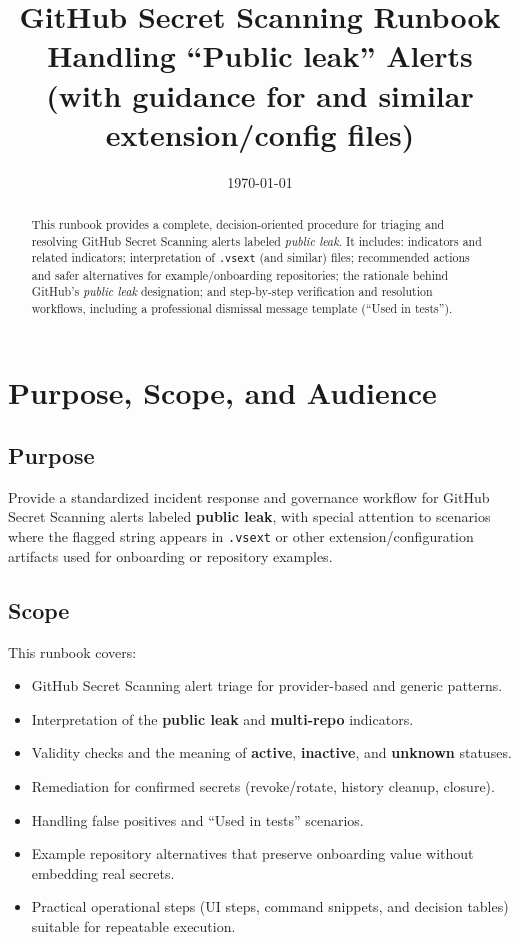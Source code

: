 \documentclass[11pt]{article}
\title{\textbf{GitHub Secret Scanning Runbook}\\
\large Handling ``Public leak'' Alerts (with guidance for \codeinline{.vsext} and similar extension/config files)}
\author{%
}
\date{\today}
\providecommand{\term}[1]{\textbf{#1}}
\newcommand{\codeinline}[1]{\texttt{#1}}
\begin{document}
\maketitle

\begin{abstract}
This runbook provides a complete, decision-oriented procedure for triaging and resolving GitHub Secret Scanning alerts labeled \emph{public leak}. It includes: indicators and related indicators; interpretation of \codeinline{.vsext} (and similar) files; recommended actions and safer alternatives for example/onboarding repositories; the rationale behind GitHub's \emph{public leak} designation; and step-by-step verification and resolution workflows, including a professional dismissal message template (``Used in tests'').
\end{abstract}

\tableofcontents
\newpage

\section{Purpose, Scope, and Audience}
\subsection{Purpose}
Provide a standardized incident response and governance workflow for GitHub Secret Scanning alerts labeled \term{public leak}, with special attention to scenarios where the flagged string appears in \codeinline{.vsext} or other extension/configuration artifacts used for onboarding or repository examples.

\subsection{Scope}
This runbook covers:
\begin{itemize}
  \item GitHub Secret Scanning alert triage for provider-based and generic patterns.
  \item Interpretation of the \term{public leak} and \term{multi-repo} indicators.
  \item Validity checks and the meaning of \term{active}, \term{inactive}, and \term{unknown} statuses.
  \item Remediation for confirmed secrets (revoke/rotate, history cleanup, closure).
  \item Handling false positives and ``Used in tests'' scenarios.
  \item Example repository alternatives that preserve onboarding value without embedding real secrets.
  \item Practical operational steps (UI steps, command snippets, and decision tables) suitable for repeatable execution.
\end{itemize}
\end{document}
